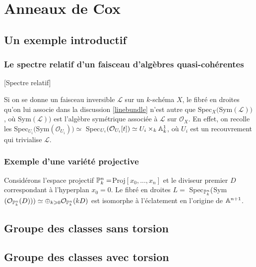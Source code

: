 \chapter{Anneaux de Cox}

\section{Un exemple introductif}

\subsection{Le spectre relatif d'un faisceau d'algèbres quasi-cohérentes}

\begin{cons}\label{relspec}[Spectre relatif]

\end{cons}

\begin{ex}\label{relspec}
Si on se donne un faisceau inversible $\mathcal{L}$ sur un $k$-schéma $X$, le fibré en droites qu'on lui associe dans la discussion \ref{linebundle} n'est autre que Spec$_X($Sym$(\mathcal{L}))$, où Sym$(\mathcal{L}))$ est l'algèbre symétrique associée à $\mathcal{L}$ sur $\mathcal{O}_X$. En effet, on recolle les Spec$_{U_i}($Sym$(\mathcal{O}_{U_i}))\simeq $ Spec$_{U_i}( \mathcal{O}_{U_i}[t])\simeq U_i \times_k \mathbb{A}^1_k$, où $U_i$ est un recouvrement qui trivialise $\mathcal{L}$.
\end{ex}

\subsection{Exemple d'une variété projective}

Considérons l'espace projectif $\mathbb{P}^n_k=$Proj$[x_0,...,x_n]$ et le diviseur premier $D$ correspondant à l'hyperplan $x_0=0$. Le fibré en droites $L=$ Spec$_{\mathbb{P}^n_k}($Sym$(\mathcal{O}_{\mathbb{P}^n_k}(D)))\simeq \oplus_{k\geqslant 0}\mathcal{O}_{\mathbb{P}^n_k}(kD)$ est isomorphe à l'éclatement en l'origine de $\mathbb{A}^{n+1}$.

\section{Groupe des classes sans torsion}


\section{Groupe des classes avec torsion}
